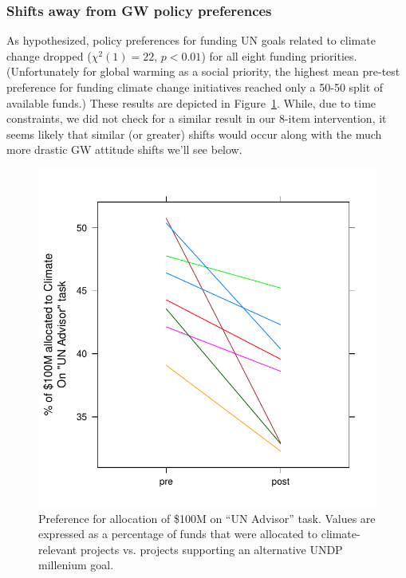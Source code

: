 \subsubsection{Shifts away from GW policy preferences}

As hypothesized, policy preferences for funding UN goals related to climate
change dropped ($\chi^2(1)=22$, $p<0.01$) for all eight funding priorities.
(Unfortunately for global warming as a social priority, the highest mean
pre-test preference for funding climate change initiatives reached only a 50-50
split of available funds.) These results are depicted in
Figure~\ref{fig:evil-alloc}. While, due to time constraints, we did not check
for a similar result in our 8-item intervention, it seems likely that similar
(or greater) shifts would occur along with the much more drastic GW attitude
shifts we'll see below.

\begin{figure}
    \centering
    \includegraphics{evil-alloc.pdf}
    \caption{Preference for allocation of \$100M on “UN Advisor” task. Values
        are expressed as a percentage of funds that were allocated to
        climate-relevant projects vs. projects supporting an alternative UNDP
        millenium goal.}
    \label{fig:evil-alloc}
\end{figure}

